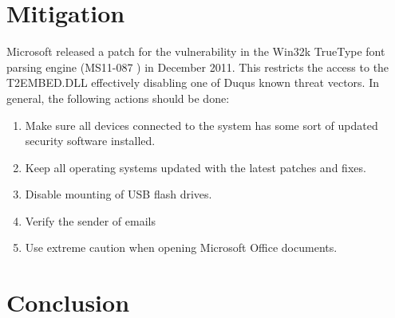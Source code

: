 \documentclass[11pt,english,a4paper]{report}
\begin{document}
\chapter{Mitigation}
Microsoft released a patch for the vulnerability in the Win32k TrueType font parsing engine (MS11-087 \cite{TT_MSB}) in  December 2011. This restricts the access to the T2EMBED.DLL effectively disabling one of Duqus known threat vectors. In general, the following actions should be done:
 \begin{enumerate}
   \item Make sure all devices connected to the system has some sort of updated security software installed.
   \item Keep all operating systems updated with the latest patches and fixes.
   \item Disable mounting of USB flash drives. 
   \item Verify the sender of emails
   \item Use extreme caution when opening Microsoft Office documents. 
  \end{enumerate}

\chapter{Conclusion}
\end{document}
